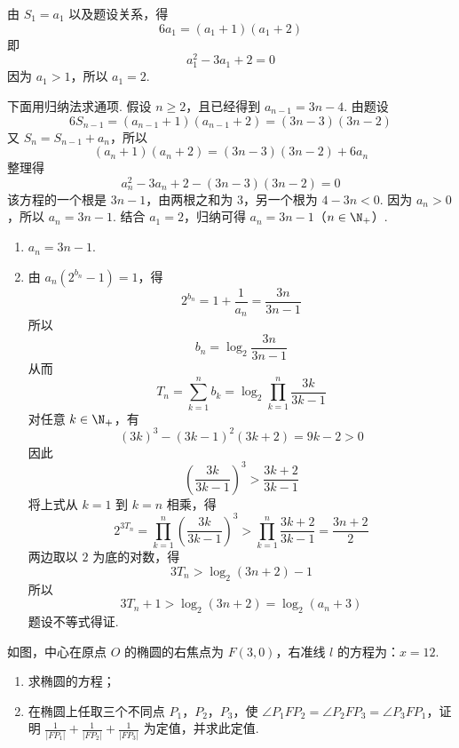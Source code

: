 \begin{solution}
由 \(S_{1}=a_{1}\) 以及题设关系，得
\[
6a_{1}=(a_{1}+1)(a_{1}+2)
\]
即
\[
a_{1}^{2}-3a_{1}+2=0
\]
因为 \(a_{1}>1\)，所以 \(a_{1}=2\).

下面用归纳法求通项. 假设 \(n\geqslant2\)，且已经得到 \(a_{n-1}=3n-4\). 由题设
\[
6S_{n-1}=(a_{n-1}+1)(a_{n-1}+2)=(3n-3)(3n-2)
\]
又 \(S_n=S_{n-1}+a_n\)，所以
\[
(a_n+1)(a_n+2)=(3n-3)(3n-2)+6a_n
\]
整理得
\[
a_n^{2}-3a_n+2-(3n-3)(3n-2)=0
\]
该方程的一个根是 \(3n-1\)，由两根之和为 \(3\)，另一个根为 \(4-3n<0\). 因为 \(a_n>0\)，所以 \(a_n=3n-1\). 结合 \(a_1=2\)，归纳可得
\(a_n=3n-1\)（\(n\in\N_{+}\)）.
\begin{enumerate}
\item \(a_n=3n-1\).
\item 由 \(a_n(2^{b_n}-1)=1\)，得
\[
2^{b_n}=1+\frac{1}{a_n}=\frac{3n}{3n-1}
\]
所以
\[
b_n=\log_{2}\frac{3n}{3n-1}
\]
从而
\[
T_n=\sum_{k=1}^{n}b_k
=\log_{2}\prod_{k=1}^{n}\frac{3k}{3k-1}
\]
对任意 \(k\in\N_{+}\)，有
\[
(3k)^3-(3k-1)^2(3k+2)=9k-2>0
\]
因此
\[
\left(\frac{3k}{3k-1}\right)^3>\frac{3k+2}{3k-1}
\]
将上式从 \(k=1\) 到 \(k=n\) 相乘，得
\[
2^{3T_n}
=\prod_{k=1}^{n}\left(\frac{3k}{3k-1}\right)^3
>\prod_{k=1}^{n}\frac{3k+2}{3k-1}
=\frac{3n+2}{2}
\]
两边取以 \(2\) 为底的对数，得
\[
3T_n>\log_{2}(3n+2)-1
\]
所以
\[
3T_n+1>\log_{2}(3n+2)=\log_{2}(a_n+3)
\]
题设不等式得证.
\end{enumerate}
\end{solution}

\begin{problem}
如图，中心在原点 \(O\) 的椭圆的右焦点为 \(F(3,0)\)，右准线 \(l\) 的方程为：\(x = 12\).

\begin{enumerate}
\item 求椭圆的方程；
\item 在椭圆上任取三个不同点 \(P_{1}\)，\(P_{2}\)，\(P_{3}\)，使 \(\angle P_{1}FP_{2} = \angle P_{2}FP_{3} = \angle P_{3}FP_{1}\)，证明 \(\frac{1}{|FP_1|} + \frac{1}{|FP_2|} + \frac{1}{|FP_3|}\) 为定值，并求此定值.
\end{enumerate}
\end{problem}

